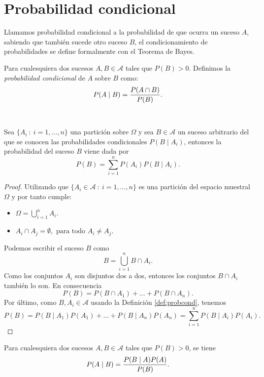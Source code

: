 \documentclass[oneside,openright,titlepage,numbers=noenddot,openany,headinclude,footinclude=true,
cleardoublepage=empty,abstractoff,BCOR=5mm,paper=a4,fontsize=12pt,main=spanish]{scrreprt}
\begin{document}
\section{Probabilidad condicional}

Llamamos probabilidad condicional a la probabilidad de que ocurra un suceso $A$, sabiendo que también sucede otro suceso $B$, el condicionamiento de probabilidades se define formalmente con el Teorema de Bayes.\\

\begin{definition} \label{def:probcond}
Para cualesquiera dos sucesos $A,B \in \mathcal{A}$ tales que $P(B) > 0$. Definimos la \textit{probabilidad condicional} de $A$ sobre $B$ como: $$P(A \mid B)=\frac{\displaystyle P(A\cap B)}{\displaystyle P(B)}.$$
\end{definition}\

\begin{theorem} \label{th:probtotal}
Sea $\{A_i \ : \ i=1,\dots,n\}$ una partición sobre $\Omega$ y sea $B\in \mathcal{A}$ un suceso arbitrario del que se conocen las probabilidades condicionales $P(B \mid A_i)$, entonces la probabilidad del suceso $B$ viene dada por $$P(B)=\sum_{i=1}^n P(A_i) P(B \mid A_i).$$
\end{theorem}

\begin{proof}
Utilizando que $\{A_i\in \mathcal{A} \ : \ i=1,\dots,n\}$ es una partición del espacio muestral $\Omega$ y por tanto cumple: 

\begin{itemize}
    \item $\displaystyle \Omega=\bigcup_{i=1}^n A_i$.
    \item $\displaystyle A_i \cap A_j = \emptyset, \text{ para todo } A_i\neq A_j.$
\end{itemize}

Podemos escribir el suceso $B$ como $$B=\bigcup_{i=1}^n B \cap A_i.$$ 
Como los conjuntos $A_i$ son disjuntos dos a dos, entonces los conjuntos $B\cap A_i$ también lo son. En consecuencia $$P(B)= P(B\cap A_1)+\dots+P(B\cap A_n).$$
Por último, como $B,A_i\in \mathcal{A}$ usando la Definición \ref{def:probcond}, tenemos $$P(B)=P(B \mid A_1) P(A_1)+\dots+P(B \mid A_n) P(A_n)=\sum_{i=1}^n P(B \mid A_i) P(A_i).$$
\end{proof}

\begin{theorem} \label{th:bayes}
Para cualesquiera dos sucesos $A,B \in \mathcal{A}$ tales que $P(B)>0$, se tiene $$P(A \mid B)=\frac{\displaystyle P(B \mid A) P(A)}{\displaystyle P(B)}.$$
\end{theorem}
\end{document}

